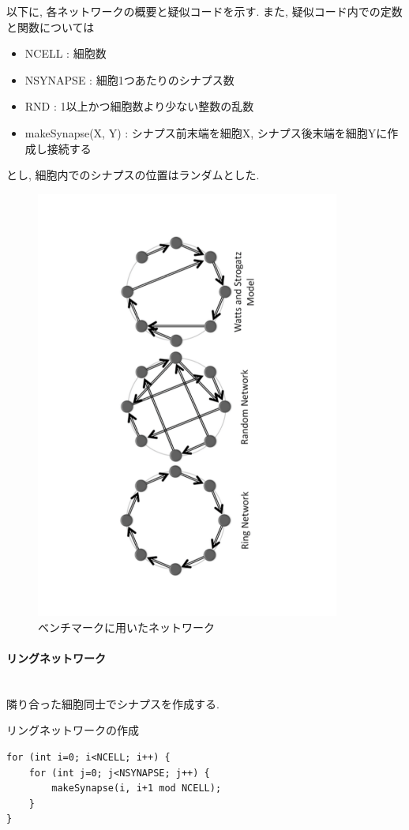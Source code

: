 以下に, 各ネットワークの概要と疑似コードを示す. また, 疑似コード内での定数と関数については
\begin{itemize}
\item NCELL : 細胞数
\item NSYNAPSE : 細胞1つあたりのシナプス数
\item RND : 1以上かつ細胞数より少ない整数の乱数
\item makeSynapse(X, Y) : シナプス前末端を細胞X, シナプス後末端を細胞Yに作成し接続する
\end{itemize}
とし, 細胞内でのシナプスの位置はランダムとした.\\
\clearpage
\begin{figure}[h]
 \begin{center}
    \includegraphics[width=10cm, angle=-90]{./images/bench.pdf}
    \caption{ベンチマークに用いたネットワーク}
    \label{fig:bench-network}
 \end{center}
\end{figure}

\paragraph{リングネットワーク}~\\
隣り合った細胞同士でシナプスを作成する.
\begin{table}[htb]
\caption {リングネットワークの作成}
{\footnotesize
\begin{framed}
\begin{verbatim}
for (int i=0; i<NCELL; i++) {
    for (int j=0; j<NSYNAPSE; j++) {
        makeSynapse(i, i+1 mod NCELL);
    }
}
\end{verbatim}
\end{framed}
}
\end{table}
\vspace{5cm}
